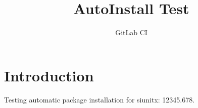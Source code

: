 \documentclass{article}
\title{AutoInstall Test}
\author{GitLab CI}
\begin{document}
\maketitle
\section{Introduction}
Testing automatic package installation for siunitx: \num{12345.678}.
\end{document}
